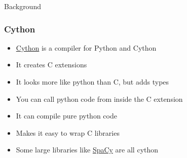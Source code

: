 \documentclass{beamer}
\theoremstyle{case}
\begin{document}
\begin{section}{Background}
\begin{frame}
    \frametitle{Cython}
    \begin{itemize}
        \item<1-> \href{https://cython.org/}{Cython} is a compiler for Python and Cython
        \item<2-> It creates C extensions
        \item<3-> It looks more like python than C, but adds types
        \item<4-> You can call python code from inside the C extension
        \item<5-> It can compile pure python code
        \item<6-> Makes it easy to wrap C libraries
        \item<7-> Some large libraries like \href{https://spacy.io/}{SpaCy} are all cython
    \end{itemize}
\end{frame}

\end{section} %
\end{document}
